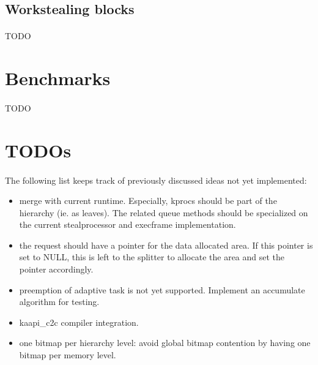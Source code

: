 \documentclass[a4paper, 11pt]{article}
\begin{document}
\subsection{Workstealing blocks}
\paragraph{}
TODO


%
\newpage
\section{Benchmarks}
\paragraph{}
TODO


% 
\newpage
\section{TODOs}
\paragraph{}
The following list keeps track of previously discussed ideas not yet implemented:
\begin{itemize}
\item merge with current runtime. Especially, kprocs should be part of the
  hierarchy (ie. as leaves). The related queue methods should be specialized
  on the current stealprocessor and execframe implementation.
\item the request should have a pointer for the data allocated area. If this
  pointer is set to NULL, this is left to the splitter to allocate the area
  and set the pointer accordingly.
\item preemption of adaptive task is not yet supported. Implement an accumulate
  algorithm for testing.
\item kaapi\_c2c compiler integration.
\item one bitmap per hierarchy level: avoid global bitmap contention by having
  one bitmap per memory level.
\end{itemize}
\end{document}
